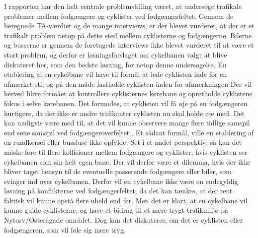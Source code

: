 I rapporten har den helt centrale problemstilling været, at undersøge trafikale problemer mellem fodgængere og cyklister ved fodgængerfeltet. Gennem de beregnede TA-værdier og de mange interviews, er der blevet vurderet, at der er et trafikalt problem netop på dette sted mellem cyklisterne og fodgængerne. Bilerne og busserne er gennem de foretagede interviews ikke blevet vurderet til at være et stort problem, og derfor er løsningsforslaget om cykelbanen valgt at blive diskuteret her, som den bedste løsning, for netop denne undersøgelse.
En etablering af en cykelbane vil have til formål at lede cyklisten inde for en afmærket sti, og på den måde fastholde cyklisten inden for afmærkningen Der vil herved blive formået at kontrollere cyklisternes kørebane og opretholde cyklistens fokus i selve kørebanen. Det formodes, at cyklisten vil få øje på en fodgængeren hurtigere, da der ikke er andre trafikanter cyklisten nu skal holde øje med. Det kan muligvis være med til, at det vil kunne observere mange flere tidlige samspil end sene samspil ved fodgængeroverfeltet.. Et sådant formål, ville en etablering af en rundkørsel eller bussluse ikke opfylde. Set i et andet perspektiv, så kan det måske føre til flere kollisioner mellem fodgængere og cyklister, hvis cyklisten ser cykelbanen som sin helt egen bane. Der vil derfor være et dilemma, hvis der ikke bliver taget hensyn til de eventuelle passerende fodgængere eller biler, som svinger ind over cykelbanen. Derfor vil en cykelbane ikke være en endegyldig løsning på konflikterne ved fodgængerfeltet, da det kan tænkes, at der rent faktisk vil kunne opstå flere uheld end før. Men det er klart, at en cykelbane vil kunne guide cyklisterne, og have et bidrag til et mere trygt trafikmiljø på Nytorv/Østerågade området. Dog kan det diskuteres, om det er cyklisten eller fodgængeren, som vil føle sig mere tryg.

